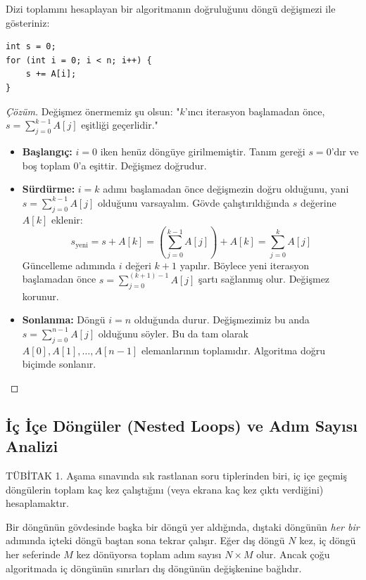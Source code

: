\begin{example}
Dizi toplamını hesaplayan bir algoritmanın doğruluğunu döngü değişmezi ile gösteriniz:
\begin{lstlisting}[language=CTemel]
int s = 0;
for (int i = 0; i < n; i++) {
    s += A[i];
}
\end{lstlisting}
\end{example}

\begin{proof}[Çözüm]
Değişmez önermemiz şu olsun: "$k$'ıncı iterasyon başlamadan önce, $s = \sum_{j=0}^{k-1} A[j]$ eşitliği geçerlidir."

\begin{itemize}
    \item \textbf{Başlangıç:} $i = 0$ iken henüz döngüye girilmemiştir. Tanım gereği $s = 0$'dır ve boş toplam $0$'a eşittir. Değişmez doğrudur.
    \item \textbf{Sürdürme:} $i = k$ adımı başlamadan önce değişmezin doğru olduğunu, yani $s = \sum_{j=0}^{k-1} A[j]$ olduğunu varsayalım. Gövde çalıştırıldığında $s$ değerine $A[k]$ eklenir:
    \[
    s_{\text{yeni}} = s + A[k] = \left(\sum_{j=0}^{k-1} A[j]\right) + A[k] = \sum_{j=0}^{k} A[j]
    \]
    Güncelleme adımında $i$ değeri $k+1$ yapılır. Böylece yeni iterasyon başlamadan önce $s = \sum_{j=0}^{(k+1)-1} A[j]$ şartı sağlanmış olur. Değişmez korunur.
    \item \textbf{Sonlanma:} Döngü $i = n$ olduğunda durur. Değişmezimiz bu anda $s = \sum_{j=0}^{n-1} A[j]$ olduğunu söyler. Bu da tam olarak $A[0], A[1], \dots, A[n-1]$ elemanlarının toplamıdır. Algoritma doğru biçimde sonlanır.
\end{itemize}
\end{proof}

\subsection{İç İçe Döngüler (Nested Loops) ve Adım Sayısı Analizi}

TÜBİTAK 1. Aşama sınavında sık rastlanan soru tiplerinden biri, iç içe geçmiş döngülerin toplam kaç kez çalıştığını (veya ekrana kaç kez çıktı verdiğini) hesaplamaktır.

Bir döngünün gövdesinde başka bir döngü yer aldığında, dıştaki döngünün \emph{her bir} adımında içteki döngü baştan sona tekrar çalışır. Eğer dış döngü $N$ kez, iç döngü her seferinde $M$ kez dönüyorsa toplam adım sayısı $N \times M$ olur. Ancak çoğu algoritmada iç döngünün sınırları dış döngünün değişkenine bağlıdır.

